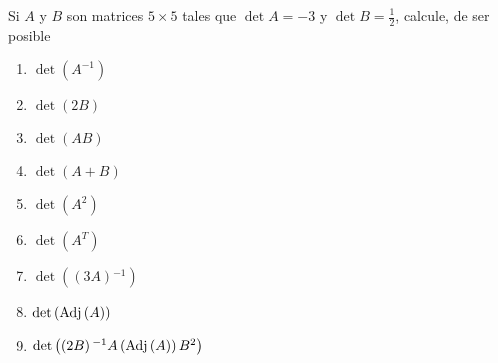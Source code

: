 \item Si \(A\) y \(B\) son matrices \(5 \times 5\) tales que \(\det A = −3\) y \(\det B = \frac{1}{2}\), calcule, de ser posible
    \begin{enumerate}[label=\listAlph]
        \item \(\det\left(A^{-1}\right)\)
        \item \(\det\left(2B\right)\)
        \item \(\det\left(AB\right)\)
        \item \(\det\left(A + B\right)\)
        \item \(\det\left(A^2\right)\)
        \item \(\det\left(A^T\right)\)
        \item \(\det\left(\left(3A\right){}^{-1}\right)\)
        \item \(\det\left(\text{Adj}\left(A\right)\right)\)
        \item \(\det\left(\left(2B\right){}^{-1} A\left(\text{Adj}\left(A\right)\right)B^2\right)\)
    \end{enumerate}
